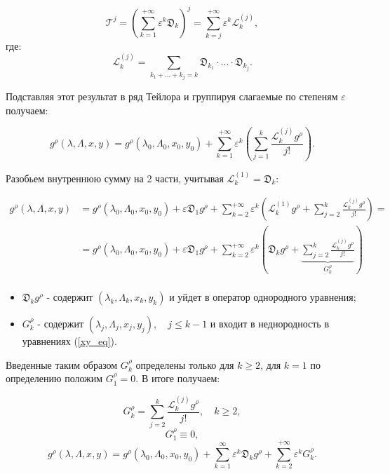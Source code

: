 \begin{enumerate}
$$\mathcal{T}^j = \left( \sum_{k=1}^{+\infty} \varepsilon^k \mathfrak{D}_k \right)^j = \sum_{k=j}^{+\infty} \varepsilon^k \mathcal{L}_k^{(j)},$$
где:
$$\mathcal{L}_k^{(j)} = \sum_{k_1+...+k_j = k} \mathfrak{D}_{k_1} \cdot ... \cdot \mathfrak{D}_{k_j}.$$

Подставляя этот результат в ряд Тейлора и группируя слагаемые по степеням $\varepsilon$ получаем:

$$g^\rho(\lambda,\Lambda,x,y) = g^\rho(\lambda_0,\Lambda_0,x_0,y_0) + \sum_{k=1}^{+\infty} \varepsilon^k \left( \sum_{j=1}^k \frac{\mathcal{L}_k^{(j)} g^\rho}{j!} \right).$$


Разобьем внутреннюю сумму на 2 части, учитывая $\mathcal{L}_k^{(1)} = \mathfrak{D}_k$:

\begin{equation*}
\begin{aligned}
g^\rho(\lambda,\Lambda,x,y) 
    &= g^\rho(\lambda_0,\Lambda_0,x_0,y_0) + \varepsilon \mathfrak{D}_1 g^\rho + \sum_{k=2}^{+\infty} \varepsilon^k \left( \mathcal{L}_k^{(1)}g^\rho + \sum_{j=2}^k \frac{\mathcal{L}_k^{(j)} g^\rho}{j!} \right) = \\ 
    &= g^\rho(\lambda_0,\Lambda_0,x_0,y_0) + \varepsilon \mathfrak{D}_1 g^\rho + \sum_{k=2}^{+\infty} \varepsilon^k \left( \mathfrak{D}_k g^\rho + \underbrace{\sum_{j=2}^k \frac{\mathcal{L}_k^{(j)} g^\rho}{j!}}_{G_k^\rho} \right) \\ 
\end{aligned}
\end{equation*}

\begin{itemize}
\item $\mathfrak{D}_k g^\rho$ - содержит $(\lambda_k, \Lambda_k, x_k, y_k)$ и уйдет в оператор однородного уравнения;
\item $G_k^\rho$ - содержит $(\lambda_j, \Lambda_j, x_j, y_j), \quad j \le k-1$ и входит в неднородность в уравнениях (\ref{xy_eq}).
\end{itemize}

Введенные таким образом $G_k^\rho$ определены только для $k \ge 2$, для $k=1$ по определению положим $G_1^\rho = 0$. В итоге получаем:

\begin{equation}
G_k^\rho = \sum_{j=2}^{k} \frac{\mathcal{L}_k^{(j)} g^\rho }{j!}, \quad k \ge 2,
\label{G_def}
\end{equation}
$$G_1^\rho \equiv 0,$$
$$g^\rho(\lambda,\Lambda,x,y) = g^\rho(\lambda_0,\Lambda_0,x_0,y_0) + \sum_{k=1}^{\infty} \varepsilon^k \mathfrak{D}_k g^\rho + \sum_{k=2}^{+\infty} \varepsilon^k G_k^\rho.$$


\end{enumerate}

